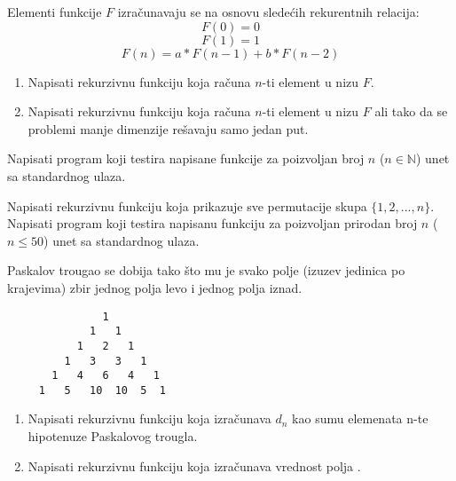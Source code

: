 \begin{Exercise}[label=106]
Elementi funkcije $F$ izračunavaju se na osnovu sledećih rekurentnih relacija:
 $$F(0) = 0$$
 $$F(1) = 1$$
 $$F(n) = a* F(n-1) + b*F(n-2)$$
\begin{enumerate}
\item Napisati rekurzivnu funkciju  koja računa $n$-ti element u nizu $F$.
\item Napisati rekurzivnu funkciju  koja računa $n$-ti element u nizu $F$ ali tako da se problemi manje dimenzije rešavaju samo jedan put.
\end{enumerate}
  Napisati program koji testira napisane funkcije za poizvoljan broj $n$ ($n \in \mathbb N$) unet sa standardnog ulaza.
\end{Exercise}
\begin{Answer}[ref=106]
\end{Answer}

\begin{Exercise}[label=107]
Napisati rekurzivnu funkciju koja prikazuje sve permutacije skupa $\{1, 2, ... ,n\}$. Napisati program koji testira napisanu funkciju za poizvoljan prirodan broj $n$ ($n \le 50$) unet sa standardnog ulaza.
\end{Exercise}
\begin{Answer}[ref=107]
\end{Answer}

\begin{Exercise}[label=108]
 Paskalov trougao se dobija tako što mu je svako polje
(izuzev jedinica po krajevima) zbir jednog polja levo i
jednog polja iznad.
\begin{verbatim}
               1
             1   1
           1   2   1
         1   3   3   1
       1   4   6   4   1
     1   5   10  10  5  1
\end{verbatim}
\begin{enumerate}
\item Napisati rekurzivnu funkciju koja izračunava $d_n$ kao sumu elemenata n-te hipotenuze Paskalovog trougla.
\item Napisati rekurzivnu funkciju koja izračunava vrednost polja . 
\end{enumerate}

\end{Exercise}
\begin{Answer}[ref=108]
\end{Answer}

